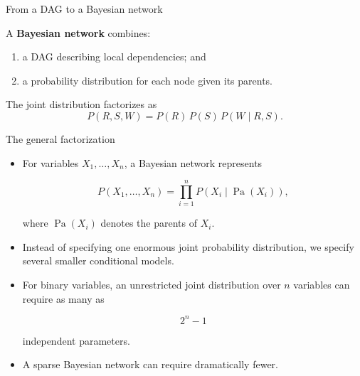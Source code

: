 \documentclass[aspectratio=43,11pt]{beamer}
\begin{document}
\begin{frame}{From a DAG to a Bayesian network}

A \textbf{Bayesian network} combines:

\begin{enumerate}
  \item a DAG describing local dependencies; and
  \item a probability distribution for each node given its parents.
\end{enumerate}

\begin{center}
\end{center}

The joint distribution factorizes as
\[
P(R,S,W)
=
P(R)\,P(S)\,P(W\mid R,S).
\]

\end{frame}

\begin{frame}{The general factorization}

\begin{itemize}
\item For variables \(X_1,\ldots,X_n\), a Bayesian network represents

\[
P(X_1,\ldots,X_n)
=
\prod_{i=1}^{n}
P\!\left(
  X_i \mid \operatorname{Pa}(X_i)
\right),
\]

where \(\operatorname{Pa}(X_i)\) denotes the parents of \(X_i\).

\item Instead of specifying one enormous joint probability distribution, we
specify several smaller conditional models.

\item For binary variables, an unrestricted joint distribution over \(n\)
variables can require as many as

\[
2^n-1
\]

independent parameters.

\item A sparse Bayesian network can require dramatically fewer.
\end{itemize}
\end{frame}
\end{document}
